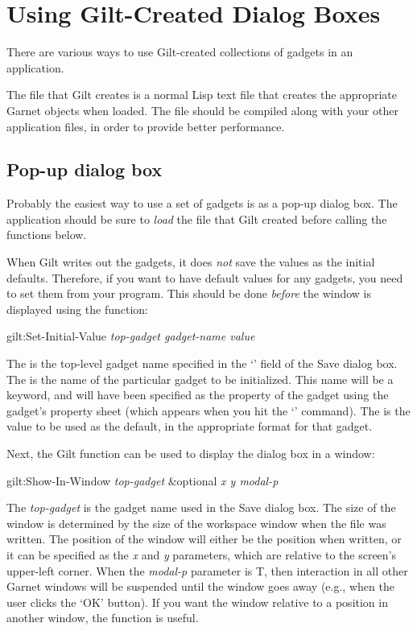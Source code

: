 \section{Using Gilt-Created Dialog Boxes}
\label{usinggiltdbs}

There are various ways to use Gilt-created collections of gadgets in
an application.

The file that Gilt creates is a normal Lisp text file that creates the
appropriate Garnet objects when loaded.  The file should be compiled
along with your other application files, in order to provide better
performance.


\subsection{Pop-up dialog box}
\label{popupdialogbox}
\label{okcancel}


Probably the easiest way to use a set of gadgets is as a pop-up dialog
box.  The application should be sure to {\it load} the file that Gilt
created before calling the functions below.

When Gilt writes out the gadgets, it does {\it not} save the values as
the initial defaults.  Therefore, if you want to have default values
for any gadgets, you need to set them from your program.  This should
be done {\it before} the window is
displayed using the function:
\begin{programexample}
gilt:Set-Initial-Value {\it top-gadget gadget-name value}\value{function}
\end{programexample}
The  is the top-level gadget name specified in the
`' field of the Save dialog box.  The
 is the name of the particular gadget to be
initialized.  This name will be a keyword, and will have been
specified as the  property of the gadget using the
gadget's property sheet (which appears when you hit the
`' command).  The  is the value to be used as
the default, in the appropriate format for that gadget.

Next, the Gilt function  can be used to display the
dialog box in a window:
\begin{programexample}
gilt:Show-In-Window {\it top-gadget} \&optional {\it x y modal-p}\value{function}
\end{programexample}
The {\it top-gadget} is the gadget name used in the Save dialog box.
The size of the window is determined by the size of the workspace
window when the file was written.  The position of the window will
either be the position when written, or it can be specified as the
{\it x} and {\it y} parameters, which are relative to the screen's
upper-left corner.  When the {\it modal-p} parameter is T, then interaction in
all other Garnet windows will be suspended until the window goes away (e.g.,
when the user clicks the `OK' button).  If you want the window relative to a
position in another window, the function  is
useful.

